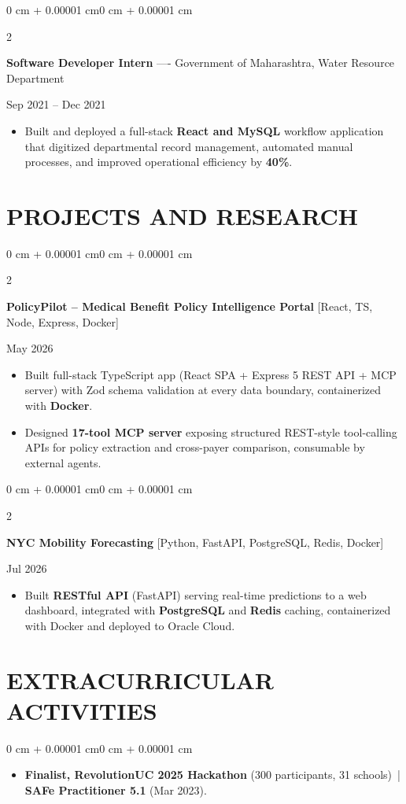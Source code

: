 \documentclass[10pt, letterpaper]{article}
\newenvironment{highlights}{
    \begin{itemize}[
        topsep=0.10 cm,
        parsep=0.06 cm,
        partopsep=0pt,
        itemsep=0.06 cm,
        leftmargin=12pt
    ]
}{
    \end{itemize}
}
\newenvironment{onecolentry}{
    \begin{adjustwidth}{0 cm + 0.00001 cm}{0 cm + 0.00001 cm}
}{
    \end{adjustwidth}
}
\newenvironment{twocolentry}[2][]{
    \onecolentry
    \def\secondColumn{#2}
    \setcolumnwidth{\fill, 4.5 cm}
    \begin{paracol}{2}
}{
    \switchcolumn \raggedleft \secondColumn
    \end{paracol}
    \endonecolentry
}
\begin{document}
\begin{twocolentry}{Sep 2021 -- Dec 2021}
\textbf{Software Developer Intern} ---- Government of Maharashtra, Water Resource Department
\end{twocolentry}
\begin{highlights}
  \item Built and deployed a full-stack \textbf{React and MySQL} workflow application that digitized departmental record management, automated manual processes, and improved operational efficiency by \textbf{40\%}.
\end{highlights}

\section{PROJECTS AND RESEARCH}
\begin{twocolentry}{May 2026}
\textbf{PolicyPilot -- Medical Benefit Policy Intelligence Portal} [React, TS, Node, Express, Docker]
\end{twocolentry}
\begin{highlights}
  \item Built full-stack TypeScript app (React SPA + Express 5 REST API + MCP server) with Zod schema validation at every data boundary, containerized with \textbf{Docker}.
  \item Designed \textbf{17-tool MCP server} exposing structured REST-style tool-calling APIs for policy extraction and cross-payer comparison, consumable by external agents.
\end{highlights}

\vspace{0.12 cm}

\begin{twocolentry}{Jul 2026}
\textbf{NYC Mobility Forecasting} [Python, FastAPI, PostgreSQL, Redis, Docker]
\end{twocolentry}
\begin{highlights}
  \item Built \textbf{RESTful API} (FastAPI) serving real-time predictions to a web dashboard, integrated with \textbf{PostgreSQL} and \textbf{Redis} caching, containerized with Docker and deployed to Oracle Cloud.
\end{highlights}

\section{EXTRACURRICULAR ACTIVITIES}
\begin{onecolentry}
\begin{highlights}
  \item \textbf{Finalist, RevolutionUC 2025 Hackathon} (300 participants, 31 schools) \,|\, \textbf{SAFe Practitioner 5.1} (Mar 2023).
\end{highlights}
\end{onecolentry}
\end{document}
